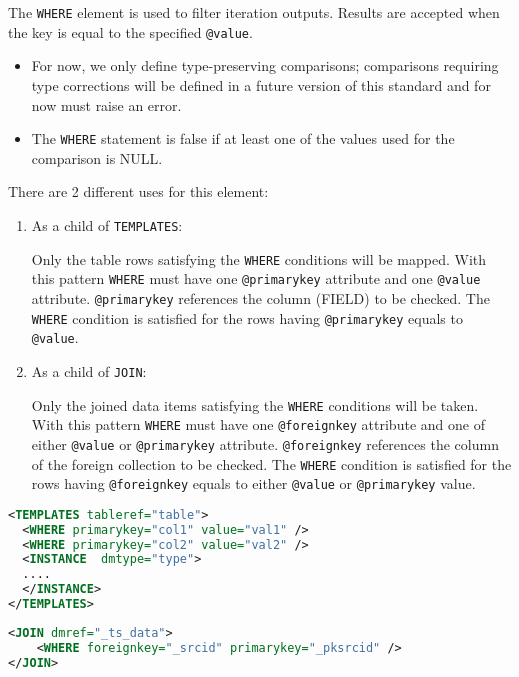 The \texttt{WHERE} element is used to filter iteration outputs. 
Results are accepted when the key is equal to the specified \texttt{@value}. 
\begin{itemize}
    \item For now, we only define type-preserving comparisons; comparisons requiring type corrections will be 
          defined in a future version of this standard and for now must raise an error. 
    \item The \texttt{WHERE} statement is false if at least one of the values used for the comparison is NULL.
\end{itemize}

There  are 2 different uses for this element:
\begin{enumerate}
\item{As a child of \texttt{TEMPLATES}:}

  Only the table rows satisfying the \texttt{WHERE} conditions will be mapped. 
  With this pattern \texttt{WHERE} must have one \texttt{@primarykey} attribute and one \texttt{@value} attribute. 
  \texttt{@primarykey} references the column (FIELD) to be checked. 
  The \texttt{WHERE} condition is satisfied for the rows having \texttt{@primarykey} equals to \texttt{@value}.
             
\item{As a child of \texttt{JOIN}:}
      
  Only the joined data items satisfying the \texttt{WHERE} conditions will be taken. 
  With this pattern \texttt{WHERE} must have one \texttt{@foreignkey} attribute and one of either \texttt{@value} or \texttt{@primarykey} attribute. 
  \texttt{@foreignkey} references the column of the foreign collection to be checked. 
  The \texttt{WHERE} condition is satisfied for the rows having \texttt{@foreignkey} equals to either \texttt{@value} or \texttt{@primarykey} value.

\end{enumerate}

\begin{lstlisting}[caption={\texttt{WHERE} Example: only rows having \texttt{val1} as \texttt{col1} value and  \texttt{val2} as \texttt{col2} value must be mapped.},language=XML]
<TEMPLATES tableref="table">
  <WHERE primarykey="col1" value="val1" />
  <WHERE primarykey="col2" value="val2" />
  <INSTANCE  dmtype="type">
  ....
  </INSTANCE>
</TEMPLATES>
\end{lstlisting}

\begin{lstlisting}[caption={\texttt{WHERE} Example: the join is satisfied when the value of the 
                            \texttt{\_pksrcid} column is equal to the \texttt{\_srcid} column of the foreign table 
                            (see line~\ref{WHERE_snippet}). },language=XML]
<JOIN dmref="_ts_data">
    <WHERE foreignkey="_srcid" primarykey="_pksrcid" />
</JOIN>
\end{lstlisting}

